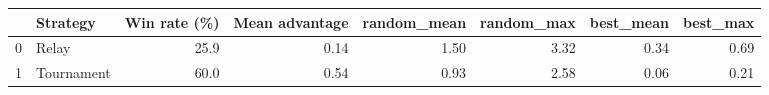\begin{tabular}{llrrrrrr}
\toprule
{} &    Strategy &  Win rate (\%) &  Mean advantage &  random\_mean &  random\_max &  best\_mean &  best\_max \\
\midrule
0 &       Relay &          25.9 &            0.14 &         1.50 &        3.32 &       0.34 &      0.69 \\
1 &  Tournament &          60.0 &            0.54 &         0.93 &        2.58 &       0.06 &      0.21 \\
\bottomrule
\end{tabular}
